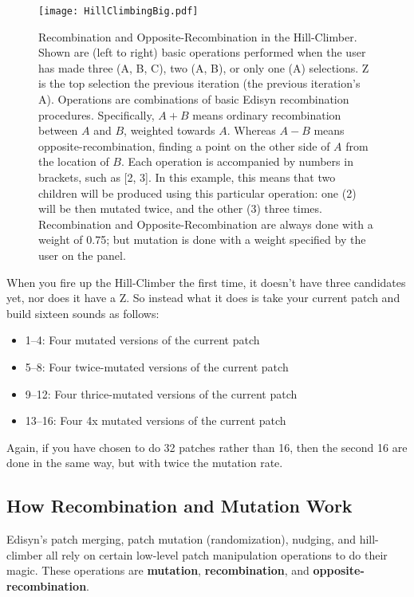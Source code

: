 \documentclass{article}
\begin{document}
{\begin{figure}[t]
\begin{center}
\texttt{[image: HillClimbingBig.pdf]}
\end{center}
\caption{Recombination and Opposite-Recombination in the Hill-Climber. Shown are (left to right) basic operations performed when the user has made three (A, B, C), two (A, B), or only one (A) selections.  Z is the top selection the previous iteration (the previous iteration's A). Operations are combinations of basic Edisyn recombination procedures.  Specifically, \(A + B\) means ordinary recombination between \(A\) and \(B\), weighted towards \(A\).  Whereas \(A - B\) means opposite-recombination, finding a point on the other side of \(A\) from the location of \(B\).   Each operation is accompanied by numbers in brackets, such as [2, 3].  In this example, this means that two children will be produced using this particular operation: one (2) will be then mutated twice, and the other (3) three times.  Recombination and Opposite-Recombination are always done with a weight of 0.75; but mutation is done with a weight specified by the user on the panel.}
\label{hcfigure}
\end{figure}

When you fire up the Hill-Climber the first time, it doesn't have three candidates yet, nor does it have a Z.  So instead what it does is take your current patch and build sixteen sounds as follows:

\begin{itemize}
\item{1--4}: Four mutated versions of the current patch
\item{5--8}: Four twice-mutated versions of the current patch
\item{9--12}: Four thrice-mutated versions of the current patch
\item{13--16}: Four 4x mutated versions of the current patch
\end{itemize}

Again, if you have chosen to do 32 patches rather than 16, then the second 16 are done in the same way, but with twice the mutation rate.

\subsection{How Recombination and Mutation Work}

Edisyn's patch merging, patch mutation (randomization), nudging, and hill-climber all rely on certain low-level patch manipulation operations to do their magic.    These operations are {\bf mutation}, {\bf recombination}, and {\bf opposite-recombination}.  

}
\end{document}
